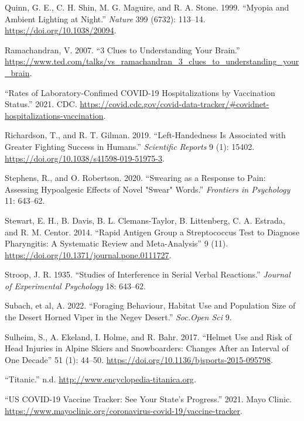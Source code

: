 \documentclass[
]{report}
\newlength{\cslhangindent}
\newenvironment{CSLReferences}[2] %
 {\begin{list}{}{%
  \setlength{\itemindent}{0pt}
  \setlength{\leftmargin}{0pt}
  \setlength{\parsep}{0pt}
  \ifodd #1
   \setlength{\leftmargin}{\cslhangindent}
   \setlength{\itemindent}{-1\cslhangindent}
  \fi
  \setlength{\itemsep}{#2\baselineskip}}}
 {\end{list}}
\begin{document}
\begin{CSLReferences}{1}{0}
Quinn, G. E., C. H. Shin, M. G. Maguire, and R. A. Stone. 1999. {``Myopia and Ambient Lighting at Night.''} \emph{Nature} 399 (6732): 113--14. \url{https://doi.org/10.1038/20094}.

Ramachandran, V. 2007. {``3 Clues to Understanding Your Brain.''} \url{https://www.ted.com/talks/vs_ramachandran_3_clues_to_understanding_your_brain}.

{``Rates of Laboratory-Confimed COVID-19 Hospitalizations by Vaccination Status.''} 2021. CDC. \url{https://covid.cdc.gov/covid-data-tracker/\#covidnet-hospitalizations-vaccination}.

Richardson, T., and R. T. Gilman. 2019. {``Left-Handedness Is Associated with Greater Fighting Success in Humans.''} \emph{Scientific Reports} 9 (1): 15402. \url{https://doi.org/10.1038/s41598-019-51975-3}.

Stephens, R., and O. Robertson. 2020. {``Swearing as a Response to Pain: Assessing Hypoalgesic Effects of Novel "Swear" Words.''} \emph{Frontiers in Psychology} 11: 643--62.

Stewart, E. H., B. Davis, B. L. Clemans-Taylor, B. Littenberg, C. A. Estrada, and R. M. Centor. 2014. {``Rapid Antigen Group a Streptococcus Test to Diagnose Pharyngitis: A Systematic Review and Meta-Analysis''} 9 (11). \url{https://doi.org/10.1371/journal.pone.0111727}.

Stroop, J. R. 1935. {``Studies of Interference in Serial Verbal Reactions.''} \emph{Journal of Experimental Psychology} 18: 643--62.

Subach, et al, A. 2022. {``Foraging Behaviour, Habitat Use and Population Size of the Desert Horned Viper in the Negev Desert.''} \emph{Soc.Open Sci} 9.

Sulheim, S., A. Ekeland, I. Holme, and R. Bahr. 2017. {``Helmet Use and Risk of Head Injuries in Alpine Skiers and Snowboarders: Changes After an Interval of One Decade''} 51 (1): 44--50. \url{https://doi.org/10.1136/bjsports-2015-095798}.

{``Titanic.''} n.d. \url{http://www.encyclopedia-titanica.org}.

{``US COVID-19 Vaccine Tracker: See Your State's Progress.''} 2021. Mayo Clinic. \url{https://www.mayoclinic.org/coronavirus-covid-19/vaccine-tracker}.


\end{CSLReferences}
\end{document}
